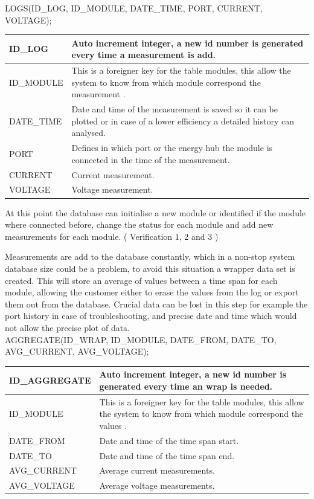 LOGS(ID\_LOG, ID\_MODULE, DATE\_TIME, PORT, CURRENT, VOLTAGE);

\begin{table}[H]
\centering
	\begin{tabular}{| p{2cm} | p{10cm} |}
		\hline
		ID\_LOG & Auto increment integer, a new id number is generated every time a measurement is add. \\\hline
		ID\_MODULE & This is a foreigner key for the table modules, this allow the system to know from which module correspond the measurement .\\\hline
		DATE\_TIME & Date and time of the measurement is saved so it can be plotted or in case of a lower efficiency a detailed history can analysed. \\\hline
		PORT & Defines in which port or the energy hub the module is connected in the time of the measurement. \\\hline
		CURRENT & Current measurement. \\\hline
		VOLTAGE & Voltage measurement. \\\hline
	\end{tabular}
\end{table}

At this point the database can initialise a new module or identified if the module where connected before, change the status for each module and add new measurements for each module. ( Verification 1, 2 and 3 )

Measurements are add to the database constantly, which in a non-stop system database size could be a problem, to avoid this situation a wrapper data set is created. This will store an average of values between a time span for each module, allowing the customer either to erase the values from the log or export them out from the database. Crucial data can be lost in this step for example the port history in case of troubleshooting, and precise date and time which would not allow the precise plot of data.\\


AGGREGATE(ID\_WRAP, ID\_MODULE, DATE\_FROM, DATE\_TO, AVG\_CURRENT, AVG\_VOLTAGE);

\begin{table}[H]
\centering
	\begin{tabular}{| l | p{10cm} |}
		\hline
		ID\_AGGREGATE & Auto increment integer, a new id number is generated every time an wrap is needed. \\\hline
		ID\_MODULE & This is a foreigner key for the table modules, this allow the system to know from which module correspond the values .\\\hline
		DATE\_FROM & Date and time of the time span start. \\\hline
		DATE\_TO & Date and time of the time span end. \\\hline
		AVG\_CURRENT & Average current measurements. \\\hline
		AVG\_VOLTAGE & Average voltage measurements. \\\hline
	\end{tabular}
\end{table}

